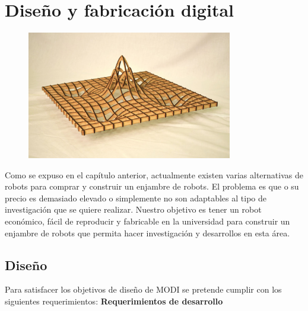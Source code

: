 \chapter{Diseño y fabricación digital} 

\label{Chapter4} 


\begin{figure}[htbp]
	\centering
		\includegraphics[width=0.8\textwidth]{./Figures/FabDig.JPG}
	\label{fig:MODI}
\end{figure}

Como se expuso en el capítulo anterior, actualmente existen varias alternativas de robots para comprar y construir un enjambre de robots. El problema es que o su precio es demasiado elevado o simplemente no son adaptables al tipo de investigación que se quiere realizar. Nuestro objetivo es tener un robot económico, fácil de reproducir y fabricable en la universidad para construir un enjambre de robots que permita hacer investigación y desarrollos en esta área.


\section{Diseño}

Para satisfacer los objetivos de diseño de MODI se pretende cumplir con los siguientes requerimientos:
\newpage 
\textbf{Requerimientos de desarrollo}

